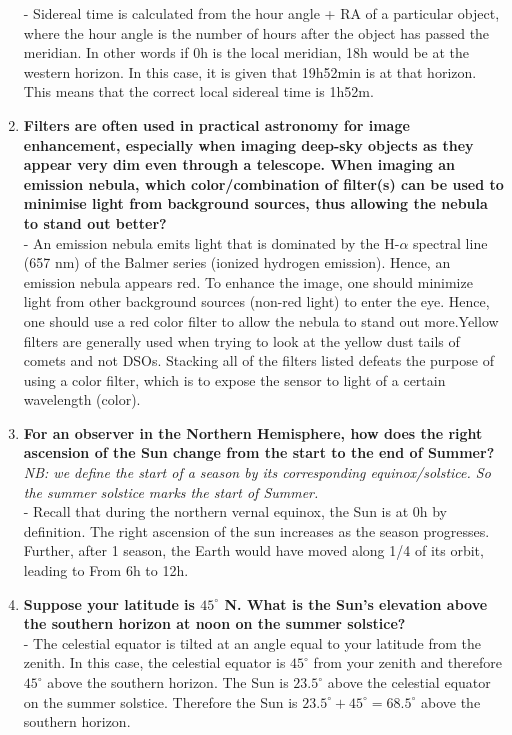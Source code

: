 \documentclass[a4paper,12pt]{extarticle}
\begin{document}
\begin{enumerate}
- Sidereal time is calculated from the hour angle + RA of a particular object, where the hour angle is the number of hours after the object has passed the meridian. In other words if 0h is the local meridian, 18h would be at the western horizon. In this case, it is given that 19h52min is at that horizon. This means that the correct local sidereal time is 1h52m. 

\item \textbf{Filters are often used in practical astronomy for image enhancement, especially when imaging deep-sky objects as they appear very dim even through a telescope. When imaging an emission nebula, which color/combination of filter(s) can be used to minimise light from background sources, thus allowing the nebula to stand out better?}\\

- An emission nebula emits light that is dominated by the H-$\alpha$ spectral line (657 nm) of the Balmer series (ionized hydrogen emission). Hence, an emission nebula appears red. To enhance the image, one should minimize light from other background sources (non-red light) to enter the eye. Hence,
one should use a red color filter to allow the nebula to stand out more.Yellow filters are generally used when trying to look at the yellow dust tails of comets and not DSOs. Stacking all of the filters listed defeats the purpose of using a color filter, which is to expose the sensor to light of a
certain wavelength (color).

\item \textbf{For an observer in the Northern Hemisphere, how does the right ascension of the Sun change from the start to the end of Summer?}\\ 

\textit{NB: we define the start of a season by its corresponding equinox/solstice. So the summer solstice marks the start of Summer.}\\

- Recall that during the northern vernal equinox, the Sun is at 0h by definition. The right ascension of the sun increases as the season progresses. Further, after 1 season, the Earth would have moved along 1/4 of its orbit, leading to From 6h to 12h.
\item \textbf{Suppose your latitude is $45^\circ$ N. What is the Sun's elevation above the southern horizon at noon on the summer solstice?}\\
- The celestial equator is tilted at an angle equal to your latitude from the zenith. In this case, the celestial equator is $45^\circ$ from your zenith and therefore $45^\circ$ above the southern horizon. The Sun is $23.5^\circ$ above the celestial equator on the summer solstice. Therefore the Sun is $23.5^\circ+ 45^\circ= 68.5^\circ$ above the southern horizon.


\end{enumerate}
\end{document}
